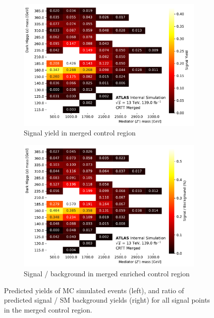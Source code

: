\begin{figure}[htbp]
  \centering
  \begin{subfigure}{0.45\textwidth}
    \includegraphics[width=\textwidth]{Figures/5/SignalYields_CRTT_Merged.pdf}
    \caption{Signal yield in merged \ttbar control region}
    \label{fig:signal_yield_CRTT_merged_CR}
    \end{subfigure} \hspace{1em}
  \begin{subfigure}{0.45\textwidth}
    \includegraphics[width=\textwidth]{Figures/5/SignalContaminations_CRTT_Merged.pdf}
    \caption{Signal / background in merged \ttbar enriched control region}
    \label{fig:signal_over_bkg_CRTT_merged_CR}
    \end{subfigure}
  \caption[Signal contaminations in merged SR and CRTT]{Predicted yields of MC simulated events (left), and ratio of predicted signal / SM background yields (right) for all signal points in the merged \ttbar control region.}
  \label{fig:signal_composition_CRTT_merged}
\end{figure}


